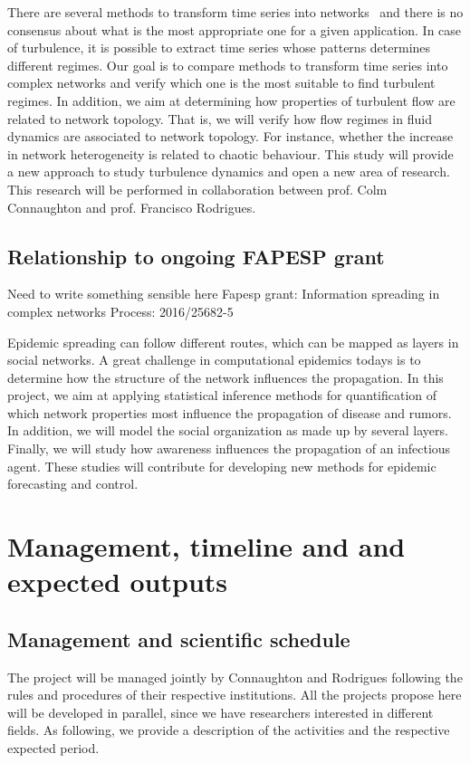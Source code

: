 There are several methods to transform time series into 
networks~\cite{Lacasa08, Marwan09} and there is no consensus about what is the 
most appropriate one for a given application. In case of turbulence, it is 
possible to extract time series whose patterns determines different regimes. 
Our goal is to compare methods to transform time series into complex networks 
and verify which one is the most suitable to find turbulent regimes. In 
addition, we aim at determining how properties of turbulent flow are related to 
network topology. That is, we will verify how flow regimes in fluid dynamics 
are associated to network topology. For instance, whether the increase in 
network heterogeneity is related to chaotic behaviour. This study will provide 
a new approach to study turbulence dynamics and open a new area of research. 
This research will be performed in collaboration between prof. Colm Connaughton 
and prof. Francisco Rodrigues.

\subsection{Relationship to ongoing FAPESP grant}
{\color{red} Need to write something sensible here}
Fapesp grant: Information spreading in complex networks
Process: 2016/25682-5

Epidemic spreading can follow different routes, which can be mapped as layers 
in social networks. A great challenge in computational epidemics todays is to 
determine how the structure of the network influences the propagation. In this 
project, we aim at applying statistical inference methods for quantification of 
which network properties most influence the propagation of disease and rumors. 
In addition, we will model the social organization as made up by several 
layers. Finally, we will study how awareness influences the propagation of an 
infectious agent. These studies will contribute for developing new methods for 
epidemic forecasting and control.

\section{Management, timeline and and expected outputs}
\label{sec-timeline}
\subsection{Management and scientific schedule}
The project will be managed jointly by Connaughton and Rodrigues following the 
rules and procedures of their respective institutions. All the projects propose 
here will be developed in parallel, since we have researchers interested in 
different fields. As following, we provide a description of the activities and 
the respective expected period.

